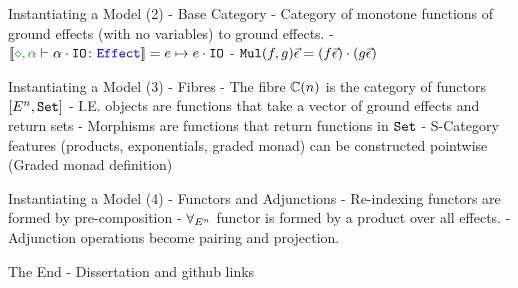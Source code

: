 \documentclass{beamer}
\newcommand\script[1]{}
\begin{document}
\begin{frame}{Instantiating a Model (2) - Base Category}
    - Category of monotone functions of ground effects (with no variables) to ground effects.
    - $\deno{\typerelation{\nil,\a}{\a\dot\texttt{IO}}{\effect}} = e\mapsto e\dot\texttt{IO}$
    - $\texttt{Mul}(f, g)\vec{\epsilon} = (f\vec{\epsilon})\cdot(g\vec{\epsilon}) $

    \script{
        - Firstly, we want to build a base category
        - to do this, we shall consider the category of monotone functions taking vectors of ground effects and returning ground effects
        - We construct the multiplication operator using the $\dot$ monoid operator from the EC spec
    }
\end{frame}

\begin{frame}{Instantiating a Model (3) - Fibres}
    - The fibre $\mathbb{C}(n)$ is the category of functors $[E^n, \texttt{Set}]$
    - I.E. objects are functions that take a vector of ground effects and return sets
    - Morphisms are functions that return functions in $\texttt{Set}$
    - S-Category features (products, exponentials, graded monad) can be constructed pointwise (Graded monad definition)

    \script{
        - Now we can think about the fibres
        - These are functor categories
        - I.E. their objects are functions returning sets and their morphisms are dependently typed functions
        - We can construct all the of the S-Category structure  as pointwise
    }
\end{frame}

\begin{frame}{Instantiating a Model (4) - Functors and Adjunctions}
    - Re-indexing functors are formed by pre-composition
    - $\forall_{E^n}$ functor is formed by a product over all effects.
    - Adjunction operations become pairing and projection.

    \script{
        - Finally, we need to construct the various functors
        - Reindexing functors are done using precomposition
        - quantification consists of a product over all ground effects
    }
\end{frame}

\begin{frame}{The End}
    - Dissertation and github links

    \script{Thanks}
    
\end{frame}
\end{document}
